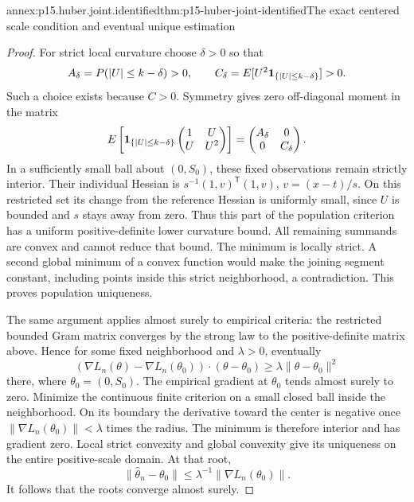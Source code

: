 \begin{annexitem}{annex:p15.huber.joint.identified}{thm:p15-huber-joint-identified}{The exact centered scale condition and eventual unique estimation}
\begin{proof}
For strict local curvature choose \(\delta>0\) so that
\[
 A_\delta=P(|U|\leq k-\delta)>0,\qquad
 C_\delta=E[U^2{\bf1}_{\{|U|\leq k-\delta\}}]>0.
\]
Such a choice exists because \(C>0\). Symmetry gives zero
off-diagonal moment in the matrix
\[
 E\left[{\bf1}_{\{|U|\leq k-\delta\}}
       \begin{pmatrix}1&U\\U&U^2\end{pmatrix}\right]
       =\begin{pmatrix}A_\delta&0\\0&C_\delta\end{pmatrix}.
\]
In a sufficiently small ball about \((0,S_0)\), these fixed
observations remain strictly interior. Their individual Hessian
is \(s^{-1}(1,v)^{\mathsf T}(1,v)\), \(v=(x-t)/s\).
On this restricted set its change from the reference Hessian
is uniformly small, since \(U\) is bounded and \(s\) stays away
from zero. Thus this part of the population criterion has a
uniform positive-definite lower curvature bound. All remaining
summands are convex and cannot reduce that bound.
The minimum is locally strict. A second global minimum of a
convex function would make the joining segment constant, including
points inside this strict neighborhood, a contradiction.
This proves population uniqueness.

The same argument applies almost surely to empirical criteria:
the restricted bounded Gram matrix converges by the strong law
to the positive-definite matrix above. Hence for some fixed
neighborhood and \(\lambda>0\), eventually
\[
 (\nabla L_n(\theta)-\nabla L_n(\theta_0))
        \mathbin{\cdot}(\theta-\theta_0)
       \geq\lambda\|\theta-\theta_0\|^2
\]
there, where \(\theta_0=(0,S_0)\).
The empirical gradient at \(\theta_0\) tends almost surely to zero.
Minimize the continuous finite criterion on a small closed ball
inside the neighborhood. On its boundary the derivative toward
the center is negative once
\(\|\nabla L_n(\theta_0)\|<\lambda\) times the radius.
The minimum is therefore interior and has gradient zero.
Local strict convexity and global convexity give its uniqueness
on the entire positive-scale domain.
At that root,
\[
             \|\widehat\theta_n-\theta_0\|
              \leq\lambda^{-1}\|\nabla L_n(\theta_0)\|.
\]
It follows that the roots converge almost surely.


\end{proof}
\end{annexitem}
